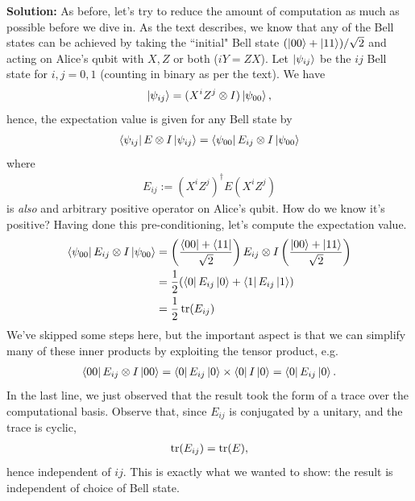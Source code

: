 \documentclass{book}
\begin{document}
    \textbf{Solution:} As before, let's try to reduce the amount of computation as much as possible before we dive in. As the text describes, we know that any of the Bell states can be achieved by taking the ``initial" Bell state $(\ket{00}+\ket{11})/\sqrt{2}$ and acting on Alice's qubit with $X, Z$ or both ($iY = ZX$). Let $\ket{\psi_{ij}}$ be the $ij$ Bell state for $i, j = 0,1$ (counting in binary as per the text). We have
    \begin{align}
        \ket{\psi_{ij}} = (X^i Z^j \otimes I) \ket{\psi_{00}},
    \end{align}
    hence, the expectation value is given for any Bell state by
    \begin{align}
        \bra{\psi_{ij}} E\otimes  I \ket{\psi_{ij}} = \bra{\psi_{00}} E_{ij} \otimes I \ket{\psi_{00}}
    \end{align}
    where
    \begin{align}
        E_{ij} := (X^i Z^j)^\dagger E (X^i Z^j)
    \end{align}
    is \emph{also} and arbitrary positive operator on Alice's qubit. How do we know it's positive? Having done this pre-conditioning, let's compute the expectation value.
    \begin{align}
    \begin{aligned}
        \bra{\psi_{00}} E_{ij}\otimes I \ket{\psi_{00}} &= \left(\frac{\bra{00}+\bra{11}}{\sqrt{2}}\right) E_{ij} \otimes I\left(\frac{\ket{00} + \ket{11}}{\sqrt{2}}\right) \\
        &=\frac{1}{2} (\bra{0}E_{ij} \ket{0} + \bra{1}E_{ij} \ket{1}) \\
        &= \frac{1}{2} \tr(E_{ij})
    \end{aligned}
    \end{align}
    We've skipped some steps here, but the important aspect is that we can simplify many of these inner products by exploiting the tensor product, e.g.
    \begin{align}  
        \bra{00}E_{ij} \otimes I \ket{00} = \bra{0}E_{ij}\ket{0} \times \bra{0} I \ket{0} = \bra{0}E_{ij}\ket{0}.
    \end{align}
    In the last line, we just observed that the result took the form of a trace over the computational basis. Observe that, since $E_{ij}$ is conjugated by a unitary, and the trace is cyclic,
    \begin{align}
        \tr (E_{ij}) = \tr (E),
    \end{align}
    hence independent of $ij$. This is exactly what we wanted to show: the result is independent of choice of Bell state.
\end{document}
